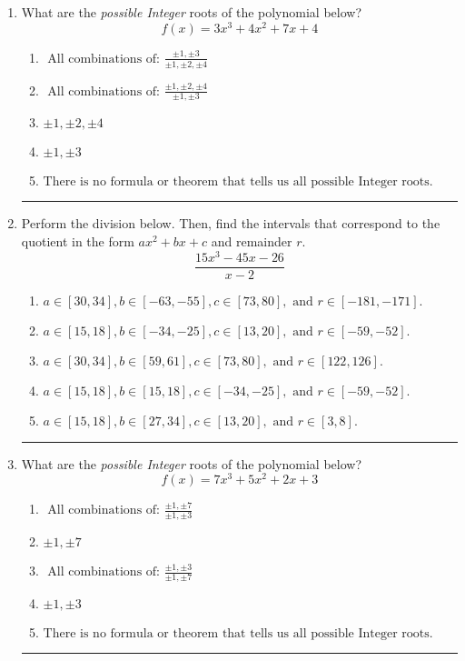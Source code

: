 \documentclass[14pt]{extbook}
\newcommand{\litem}[1]{\item#1\hspace*{-1cm}\rule{\textwidth}{0.4pt}}
\begin{document}
\begin{enumerate}
\litem{
What are the \textit{possible Integer} roots of the polynomial below?\[ f(x) = 3x^{3} +4 x^{2} +7 x + 4 \]\begin{enumerate}[label=\Alph*.]
\item \( \text{ All combinations of: }\frac{\pm 1,\pm 3}{\pm 1,\pm 2,\pm 4} \)
\item \( \text{ All combinations of: }\frac{\pm 1,\pm 2,\pm 4}{\pm 1,\pm 3} \)
\item \( \pm 1,\pm 2,\pm 4 \)
\item \( \pm 1,\pm 3 \)
\item \( \text{There is no formula or theorem that tells us all possible Integer roots.} \)

\end{enumerate} }
\litem{
Perform the division below. Then, find the intervals that correspond to the quotient in the form $ax^2+bx+c$ and remainder $r$.\[ \frac{15x^{3} -45 x -26}{x -2} \]\begin{enumerate}[label=\Alph*.]
\item \( a \in [30, 34], b \in [-63, -55], c \in [73, 80], \text{ and } r \in [-181, -171]. \)
\item \( a \in [15, 18], b \in [-34, -25], c \in [13, 20], \text{ and } r \in [-59, -52]. \)
\item \( a \in [30, 34], b \in [59, 61], c \in [73, 80], \text{ and } r \in [122, 126]. \)
\item \( a \in [15, 18], b \in [15, 18], c \in [-34, -25], \text{ and } r \in [-59, -52]. \)
\item \( a \in [15, 18], b \in [27, 34], c \in [13, 20], \text{ and } r \in [3, 8]. \)

\end{enumerate} }
\litem{
What are the \textit{possible Integer} roots of the polynomial below?\[ f(x) = 7x^{3} +5 x^{2} +2 x + 3 \]\begin{enumerate}[label=\Alph*.]
\item \( \text{ All combinations of: }\frac{\pm 1,\pm 7}{\pm 1,\pm 3} \)
\item \( \pm 1,\pm 7 \)
\item \( \text{ All combinations of: }\frac{\pm 1,\pm 3}{\pm 1,\pm 7} \)
\item \( \pm 1,\pm 3 \)
\item \( \text{There is no formula or theorem that tells us all possible Integer roots.} \)


\end{enumerate}}
\end{enumerate}
\end{document}
